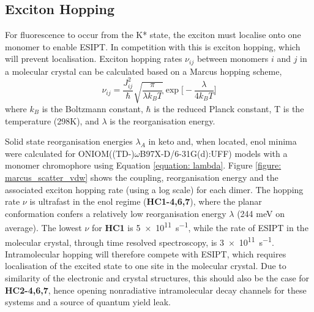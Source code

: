 \subsection{Exciton Hopping}\label{section: Connecting_Marcus}
For fluorescence to occur from the K* state, the exciton must localise onto one monomer to enable ESIPT. In competition with this is exciton hopping, which will prevent localisation. Exciton hopping rates $\nu_{ij}$ between monomers $i$ and $j$ in a molecular crystal can be calculated based on a Marcus hopping scheme,\cite{Stehr2014,Bruckner2016,Kimura2000,Bredas2004} 
\begin{equation}
\nu_{ij}=\frac{J_{ij}^2}{\hbar}\sqrt{\frac{\pi}{\lambda k_{B}T}}\exp\bigg[-\frac{\lambda}{4k_{B}T}\bigg]
\label{equation: marcus}
\end{equation}
where $k_{B}$ is the Boltzmann constant, $\hbar$ is the reduced Planck
constant, T is the temperature (298K), and $\lambda$ is the reorganisation energy.

Solid state reorganisation energies $\lambda_{A}$ in keto and, when located, enol minima were calculated for ONIOM((TD-)$\omega$B97X-D/6-31G(d):UFF) models with a monomer chromophore using Equation \ref{equation: lambda}. Figure \ref{figure: marcus_scatter_vdw} shows the coupling, reorganisation energy and the associated exciton hopping rate (using a log scale) for each dimer. The hopping rate $\nu$ is ultrafast in the enol regime (\textbf{HC1-4,6,7}), where the planar conformation confers a relatively low reorganisation energy $\lambda$ (244 meV on average). The lowest $\nu$ for \textbf{HC1} is \SI{5e11}{s^{-1}}, while the rate of ESIPT in the molecular crystal, through time resolved spectroscopy, is \SI{3e11}{s^{-1}}.\cite{Zahid2017} Intramolecular hopping will therefore compete with ESIPT, which requires localisation of the excited state to one site in the molecular crystal. Due to similarity of the electronic and crystal structures, this should also be the case for \textbf{HC2-4,6,7}, hence opening nonradiative intramolecular decay channels for these systems and a source of quantum yield leak.

